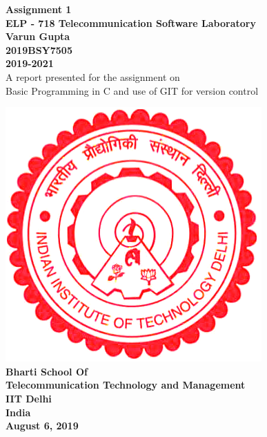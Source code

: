 \documentclass[12pt]{article}
\begin{document}

\begin{center}
\textbf{\large{Assignment 1}\\
\vspace{10mm}
ELP - 718 Telecommunication Software Laboratory \\
\vspace{5mm}
Varun Gupta \\
\vspace{2mm}
2019BSY7505 \\
\vspace{2mm}
2019-2021} \\
\vspace{10mm}
\large{A report presented for the assignment on} \\
\vspace{2mm}
\large{Basic Programming in C and use of GIT for version control}

\vspace{30mm}
\includegraphics[scale=0.5]{logo.png} \\
\vspace{12mm}
\textbf{Bharti School Of} \\
\vspace{2mm}
\textbf{Telecommunication Technology and Management} \\
\vspace{2mm}
\textbf{IIT Delhi} \\
\vspace{2mm}
\textbf{India} \\
\vspace{2mm}
\textbf{August 6, 2019}

\end{center}
\end{document}
